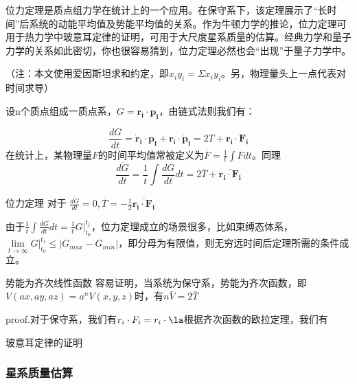 位力定理是质点组力学在统计上的一个应用。在保守系下，该定理展示了“长时间”后系统的动能平均值及势能平均值的关系。作为牛顿力学的推论，位力定理可用于热力学中玻意耳定律的证明，可用于大尺度星系质量的估算。经典力学和量子力学的关系如此密切，你也很容易猜到，位力定理必然也会“出现”于量子力学中。

（注：本文使用爱因斯坦求和约定，即$x_iy_i=\Sigma x_iy_i$。另，物理量头上一点代表对时间求导）

设n个质点组成一质点系，$G=\boldsymbol{r_i\cdot p_i}$，由链式法则我们有：

\begin{equation}
\frac{dG}{dt}=\boldsymbol{\dot{r}_i\cdot p_i}+\boldsymbol{r_i\cdot\dot{p}_i}=2T+\boldsymbol{r_i\cdot F_i}
\end{equation}
在统计上，某物理量$F$的时间平均值常被定义为$\overline{F}=\frac{1}{t}\int Fdt $。同理
\begin{equation}
\overline{\frac{dG}{dt}}=\frac{1}{t}\int \frac{dG}{dt}dt=2\overline{ T}+\overline{\boldsymbol{r_i\cdot F_i}}
\end{equation}

\begin{theorem}{位力定理}
对于 $\overline{\frac{dG}{dt}}=0,
\overline{ T}=-\frac{1}{2}\overline{\boldsymbol{r_i\cdot F_i}}$
\end{theorem}
由于$\frac{1}{t}\int \frac{dG}{dt}dt=\frac{1}{t}G\big|_{t_0}^{t_1}$，位力定理成立的场景很多，比如束缚态体系，$\lim \limits_{t \to \infty}G\big|_{t_0}^{t_1}\leq \left|{G_{max}-G_{min}}\right|$，即分母为有限值，则无穷远时间后定理所需的条件成立。
\begin{corollary}{势能为齐次线性函数}
容易证明，当系统为保守系，势能为齐次函数，即$V(ax,ay,az)=a^nV(x,y,z)$时，有$n\bar{V}=2\bar{T}$
\end{corollary}
proof.对于保守系，我们有$r_i\cdot F_i=r_i\cdot \la$根据齐次函数的欧拉定理，我们有
\begin{exercise}{玻意耳定律的证明}

\end{exercise}
\subsubsection{星系质量估算}  